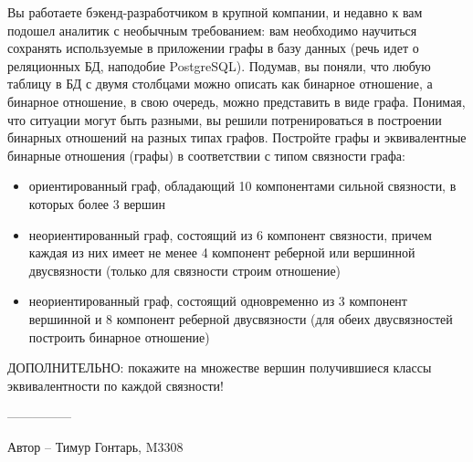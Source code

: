 \question
Вы работаете бэкенд-разработчиком в крупной компании, и недавно к вам подошел аналитик с необычным требованием: вам необходимо научиться сохранять используемые в приложении графы в базу данных (речь идет о реляционных БД, наподобие PostgreSQL). Подумав, вы поняли, что любую таблицу в БД с двумя столбцами можно описать как бинарное отношение, а бинарное отношение, в свою очередь, можно представить в виде графа. Понимая, что ситуации могут быть разными, вы решили потренироваться в построении бинарных отношений на разных типах графов. Постройте графы и эквивалентные бинарные отношения (графы) в соответствии с типом связности графа:

\begin{itemize}
\item ориентированный граф, обладающий 10 компонентами сильной связности, в которых более 3 вершин
\item неориентированный граф, состоящий из 6 компонент связности, причем каждая из них имеет не менее 4 компонент реберной или вершинной двусвязности (только для связности строим отношение)
\item неориентированный граф, состоящий одновременно из 3 компонент вершинной и 8 компонент реберной двусвязности (для обеих двусвязностей построить бинарное отношение)
\end{itemize}
ДОПОЛНИТЕЛЬНО: покажите на множестве вершин получившиеся классы эквивалентности по каждой связности!

---------------

Автор -- Тимур Гонтарь, M3308